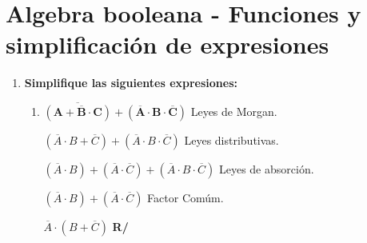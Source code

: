 \documentclass[12pt]{article}
\begin{document}
    
  
    \section*{\centering Algebra booleana - Funciones y simplificación de expresiones}

        \vspace{0.6cm}
        
        \begin{enumerate}[label = \textbf{\alph*.}]
            \item \textbf{Simplifique las siguientes expresiones:}
                \begin{enumerate}[label = \textbf{\arabic*.}]
                    \item $\mathbf{\overline{(A + \overline{B} \cdot C)} + (\overline{A} \cdot B \cdot \overline{C})}$ Leyes de Morgan.
                        \par$(\overline{A} \cdot B + \overline{C}) +  (\overline{A} \cdot B \cdot \overline{C})$ Leyes distributivas.
                        \par$(\overline{A} \cdot B) + (\overline{A} \cdot \overline{C}) +  (\overline{A} \cdot B \cdot \overline{C})$ Leyes de absorción.
                        \par$(\overline{A} \cdot B) + (\overline{A} \cdot \overline{C})$ Factor Comúm.
                        \par$\overline{A} \cdot (B + \overline{C})$ \vspace{0.5cm} \textbf{R/}
                    

\end{enumerate}
\end{enumerate}
\end{document}
